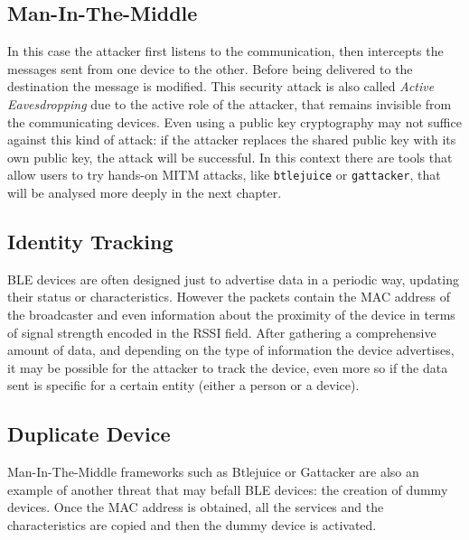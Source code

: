 \subsection{Man-In-The-Middle}
In this case the attacker first listens to the communication, then intercepts the messages sent from one device to the other. Before being delivered to the destination the message is modified. This security attack is also called \textit{Active Eavesdropping} due to the active role of the attacker, that remains invisible from the communicating devices. Even using a public key cryptography may not suffice against this kind of attack: if the attacker replaces the shared public key with its own public key, the attack will be successful.
In this context there are tools that allow users to try hands-on MITM attacks, like \texttt{btlejuice} or \texttt{gattacker}, that will be analysed more deeply in the next chapter.

\subsection{Identity Tracking}
BLE devices are often designed just to advertise data in a periodic way, updating their status or characteristics. However the packets contain the MAC address of the broadcaster and even information about the proximity of the device in terms of signal strength encoded in the RSSI field.
After gathering a comprehensive amount of data, and depending on the type of information the device advertises, it may be possible for the attacker to track the device, even more so if the data sent is specific for a certain entity (either a person or a device).

\subsection{Duplicate Device}
Man-In-The-Middle frameworks such as Btlejuice or Gattacker are also an example of another threat that may befall BLE devices: the creation of dummy devices. Once the MAC address is obtained, all the services and the characteristics are copied and then the dummy device is activated.


